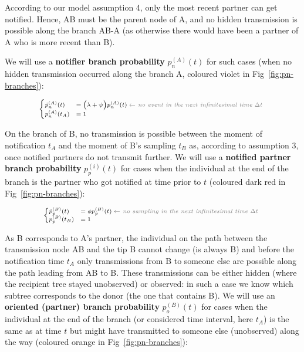 \documentclass[a4paper,10pt]{article}
\begin{document}
According to our model assumption 4, only the most recent partner can get notified. Hence, AB must be the parent node of A, and no hidden transmission is possible along the branch AB-A (as otherwise there would have been a partner of A who is more recent than B).

We will use a \textbf{notifier branch probability} $p_n^{(A)}(t)$ for such cases (when no hidden transmission occurred along the branch A, coloured violet in Fig~\ref{fig:pn-branches}):

\begin{equation}
\scriptsize
\begin{cases}
\dot{p}_n^{(A)}(t) &=  \Big(\lambda + \psi\Big) p_n^{(A)}(t)\; \textit{\color{gray} $\leftarrow$ no event in the next infinitesimal time $\Delta t$ }\\
p_n^{(A)}(t_A) &= 1\label{eq:p-nh}
\end{cases}
\end{equation}

On the branch of B, no transmission is possible between the moment of notification $t_A$ and the moment of B's sampling $t_B$ as, according to assumption 3, once notified partners do not transmit further. We will use a \textbf{notified partner branch probability} $p_p^{(i)}(t)$ for cases when the individual at the end of the branch is the partner who got notified at time prior to $t$ (coloured dark red in Fig~\ref{fig:pn-branches}):

\begin{equation}
\scriptsize
\begin{cases}
\dot{p}_p^{(B)}(t) &=  \phi p_p^{(B)}(t)\; \textit{\color{gray} $\leftarrow$ no sampling in the next infinitesimal time $\Delta t$ }\\
p_p^{(B)}(t_B) &=  1\label{eq:p-np}
\end{cases}
\end{equation}

As B corresponds to A's partner, the individual on the path between the transmission node AB and the tip B cannot change (is always B) and before the notification time $t_A$ only transmissions from B to someone else are possible along the path leading from AB to B. These transmissions can be either hidden (where the recipient tree stayed unobserved) or observed: in such a case we know which subtree corresponds to the donor (the one that contains B). We will use an \textbf{oriented (partner) branch probability} $p_o^{(B)}(t)$ for cases when the individual at the end of the branch (or considered time interval, here $t_A$) is the same as at time $t$ but might have transmitted to someone else (unobserved) along the way (coloured orange in Fig~\ref{fig:pn-branches}):
\end{document}
